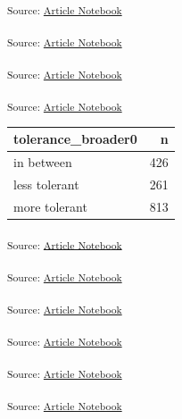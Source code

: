 \documentclass[
  letterpaper,
  DIV=11,
  numbers=noendperiod]{scrartcl}
\newenvironment{Shaded}{\begin{snugshade}}{\end{snugshade}}
\newcommand{\AttributeTok}[1]{\textcolor[rgb]{0.40,0.45,0.13}{#1}}
\newcommand{\CommentTok}[1]{\textcolor[rgb]{0.37,0.37,0.37}{#1}}
\newcommand{\FloatTok}[1]{\textcolor[rgb]{0.68,0.00,0.00}{#1}}
\newcommand{\FunctionTok}[1]{\textcolor[rgb]{0.28,0.35,0.67}{#1}}
\newcommand{\NormalTok}[1]{\textcolor[rgb]{0.00,0.23,0.31}{#1}}
\newcommand{\OtherTok}[1]{\textcolor[rgb]{0.00,0.23,0.31}{#1}}
\newcommand{\SpecialCharTok}[1]{\textcolor[rgb]{0.37,0.37,0.37}{#1}}
\newcommand{\StringTok}[1]{\textcolor[rgb]{0.13,0.47,0.30}{#1}}
\begin{document}
\textsubscript{Source:
\href{https://h-christy.github.io/data-ethics-final/index.qmd.html}{Article
Notebook}}

\textsubscript{Source:
\href{https://h-christy.github.io/data-ethics-final/index.qmd.html}{Article
Notebook}}

\textsubscript{Source:
\href{https://h-christy.github.io/data-ethics-final/index.qmd.html}{Article
Notebook}}

\textsubscript{Source:
\href{https://h-christy.github.io/data-ethics-final/index.qmd.html}{Article
Notebook}}

\begin{longtable}[]{@{}lr@{}}
\toprule\noalign{}
tolerance\_broader0 & n \\
\midrule\noalign{}
\endhead
\bottomrule\noalign{}
\endlastfoot
in between & 426 \\
less tolerant & 261 \\
more tolerant & 813 \\
\end{longtable}

\textsubscript{Source:
\href{https://h-christy.github.io/data-ethics-final/index.qmd.html}{Article
Notebook}}

\textsubscript{Source:
\href{https://h-christy.github.io/data-ethics-final/index.qmd.html}{Article
Notebook}}

\textsubscript{Source:
\href{https://h-christy.github.io/data-ethics-final/index.qmd.html}{Article
Notebook}}

\textsubscript{Source:
\href{https://h-christy.github.io/data-ethics-final/index.qmd.html}{Article
Notebook}}

\textsubscript{Source:
\href{https://h-christy.github.io/data-ethics-final/index.qmd.html}{Article
Notebook}}

\textsubscript{Source:
\href{https://h-christy.github.io/data-ethics-final/index.qmd.html}{Article
Notebook}}

\begin{Shaded}
\end{Shaded}
\end{document}
